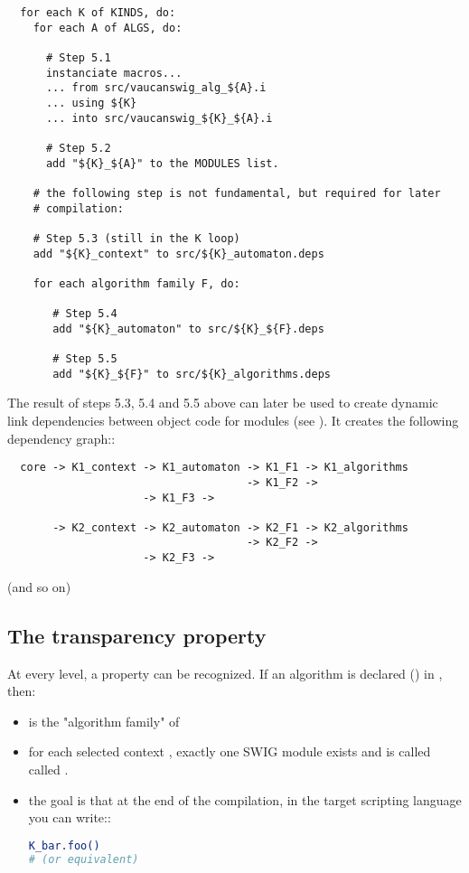 \begin{lstlisting}
  for each K of KINDS, do:
    for each A of ALGS, do:

      # Step 5.1
      instanciate macros...
      ... from src/vaucanswig_alg_${A}.i
      ... using ${K}
      ... into src/vaucanswig_${K}_${A}.i

      # Step 5.2
      add "${K}_${A}" to the MODULES list.

    # the following step is not fundamental, but required for later
    # compilation:
  
    # Step 5.3 (still in the K loop)
    add "${K}_context" to src/${K}_automaton.deps

    for each algorithm family F, do:

       # Step 5.4
       add "${K}_automaton" to src/${K}_${F}.deps
     
       # Step 5.5
       add "${K}_${F}" to src/${K}_algorithms.deps  
\end{lstlisting}

The result of steps 5.3, 5.4 and 5.5 above can later be used to create
dynamic link dependencies between object code for modules (see
). It creates the following dependency graph::

\begin{lstlisting}
  core -> K1_context -> K1_automaton -> K1_F1 -> K1_algorithms
                                     -> K1_F2 ->
				     -> K1_F3 ->
				     
       -> K2_context -> K2_automaton -> K2_F1 -> K2_algorithms
                                     -> K2_F2 ->
				     -> K2_F3 ->  
\end{lstlisting}

  (and so on)

\subsection{The transparency property}

At every level, a property can be recognized. If an algorithm
 is declared (\Cxx) in , then:
\begin{itemize}
\item {} is the "algorithm family" of 

\item for each selected context , exactly one SWIG module exists
  and is called called .

\item the goal is that at the end of the compilation, in the target
  scripting language you can write::
  \begin{lstlisting}[language=sh]
K_bar.foo()
# (or equivalent)	     
  \end{lstlisting}
\end{itemize}


